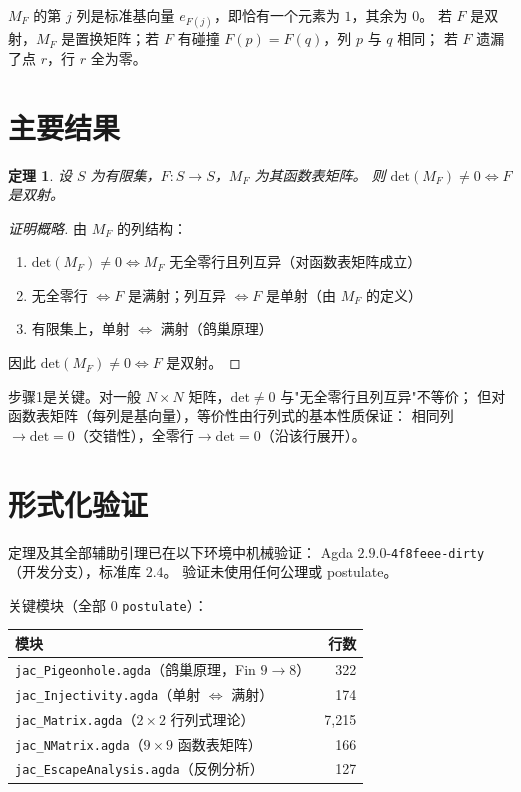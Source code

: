 \documentclass[a4paper,11pt]{article}
\newtheorem{theorem}{定理}[section]
\theoremstyle{remark}
\newcommand{\MF}{M_F}
\newcommand{\Det}{\mathrm{det}}
\begin{document}
$\MF$ 的第 $j$ 列是标准基向量 $e_{F(j)}$，即恰有一个元素为 $1$，其余为 $0$。
若 $F$ 是双射，$\MF$ 是置换矩阵；若 $F$ 有碰撞 $F(p)=F(q)$，列 $p$ 与 $q$ 相同；
若 $F$ 遗漏了点 $r$，行 $r$ 全为零。

\section{主要结果}

\begin{theorem}\label{thm:main}
设 $S$ 为有限集，$F:S\to S$，$\MF$ 为其函数表矩阵。
则 $\Det(\MF)\neq 0 \iff F$ 是双射。
\end{theorem}

\begin{proof}[证明概略]
由 $\MF$ 的列结构：
\begin{enumerate}
\item $\Det(\MF)\neq 0 \iff \MF$ 无全零行且列互异（对函数表矩阵成立）
\item 无全零行 $\iff F$ 是满射；列互异 $\iff F$ 是单射（由 $\MF$ 的定义）
\item 有限集上，单射 $\iff$ 满射（鸽巢原理）
\end{enumerate}
因此 $\Det(\MF)\neq 0 \iff F$ 是双射。
\end{proof}

步骤1是关键。对一般 $N\times N$ 矩阵，$\Det\neq0$ 与"无全零行且列互异"不等价；
但对函数表矩阵（每列是基向量），等价性由行列式的基本性质保证：
相同列$\to\Det=0$（交错性），全零行$\to\Det=0$（沿该行展开）。

\section{形式化验证}

定理及其全部辅助引理已在以下环境中机械验证：
Agda $2.9.0$-\texttt{4f8feee-dirty}（开发分支），标准库 $2.4$。
验证未使用任何公理或 postulate。

关键模块（全部 $0$ \texttt{postulate}）：

\begin{center}
\begin{tabular}{l r}
\hline
模块 & 行数 \\
\hline
\texttt{jac\_Pigeonhole.agda}（鸽巢原理，Fin $9\to8$）& 322 \\
\texttt{jac\_Injectivity.agda}（单射 $\iff$ 满射）& 174 \\
\texttt{jac\_Matrix.agda}（$2\times2$ 行列式理论）& 7,215 \\
\texttt{jac\_NMatrix.agda}（$9\times9$ 函数表矩阵）& 166 \\
\texttt{jac\_EscapeAnalysis.agda}（反例分析）& 127 \\
\hline
\end{tabular}
\end{center}
\end{document}
